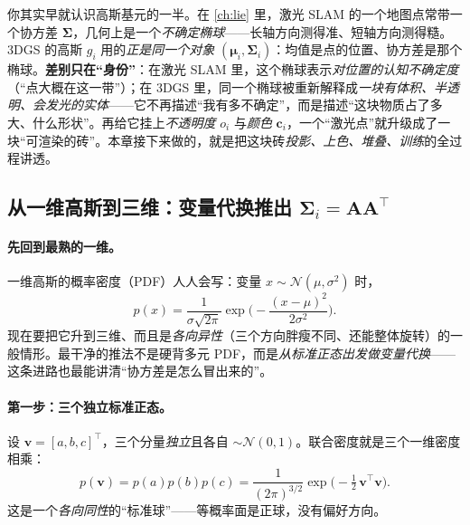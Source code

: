 \begin{insight}[一个 LiDAR-native 的入口：高斯 $=$ 带不确定椭球的点，再加“可渲染”]
你其实早就认识高斯基元的一半。在 \cref{ch:lie} 里，激光 SLAM 的一个地图点常带一个协方差 $\boldsymbol\Sigma$，几何上是一个\emph{不确定椭球}——长轴方向测得准、短轴方向测得糙。3DGS 的高斯 $g_i$ 用的\emph{正是同一个对象} $(\boldsymbol\mu_i,\boldsymbol\Sigma_i)$：均值是点的位置、协方差是那个椭球。\textbf{差别只在“身份”}：在激光 SLAM 里，这个椭球表示\emph{对位置的认知不确定度}（“点大概在这一带”）；在 3DGS 里，同一个椭球被重新解释成\emph{一块有体积、半透明、会发光的实体}——它不再描述“我有多不确定”，而是描述“这块物质占了多大、什么形状”。再给它挂上\emph{不透明度} $o_i$ 与\emph{颜色} $\mathbf c_i$，一个“激光点”就升级成了一块“可渲染的砖”。本章接下来做的，就是把这块砖\emph{投影、上色、堆叠、训练}的全过程讲透。
\end{insight}

\subsection{从一维高斯到三维：变量代换推出 \texorpdfstring{$\boldsymbol\Sigma_i=\mathbf A\mathbf A^\top$}{_i= A A^T}}

\paragraph{先回到最熟的一维。}
一维高斯的概率密度（PDF）人人会写：变量 $x\sim\mathcal N(\mu,\sigma^2)$ 时，
\begin{equation}
  p(x)=\frac{1}{\sigma\sqrt{2\pi}}\exp\!\Big(-\frac{(x-\mu)^2}{2\sigma^2}\Big).
  \label{eq:3dgs-1d}
\end{equation}
现在要把它升到三维、而且是\emph{各向异性}（三个方向胖瘦不同、还能整体旋转）的一般情形。最干净的推法不是硬背多元 PDF，而是\emph{从标准正态出发做变量代换}——这条进路也最能讲清“协方差是怎么冒出来的”。

\paragraph{第一步：三个独立标准正态。}
设 $\mathbf v=[a,b,c]^\top$，三个分量\emph{独立}且各自 $\sim\mathcal N(0,1)$。联合密度就是三个一维密度相乘：
\begin{equation}
  p(\mathbf v)=p(a)p(b)p(c)=\frac{1}{(2\pi)^{3/2}}\exp\!\Big(-\tfrac12\,\mathbf v^\top\mathbf v\Big).
  \label{eq:3dgs-std3d}
\end{equation}
这是一个\emph{各向同性}的“标准球”——等概率面是正球，没有偏好方向。

